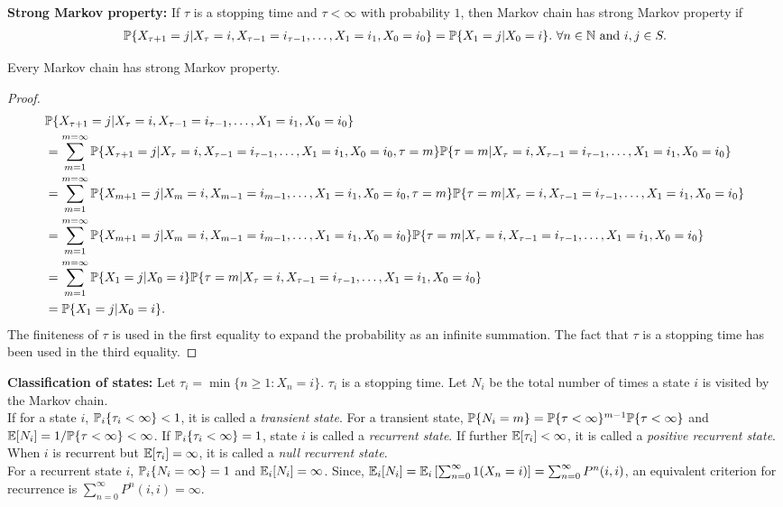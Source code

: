 \documentclass[all-lectures.tex]{subfiles}
\begin{document}
\indent \textbf{Strong Markov property:} If $\tau$ is a stopping time and $\tau < \infty$ with probability $1$, then Markov chain has strong Markov property if
\begin{align*}
\P\{X_{\tau+1} = j|X_{\tau} = i, X_{\tau-1} = i_{\tau-1},\dots,X_1 = i_1,X_0 = i_0\} = \P\{X_1 = j|X_{0} = i\}. \ \forall n \in \mathbb{N} \text{ and }i,j \in S.
\end{align*}
\begin{thm}
Every Markov chain has strong Markov property.
\begin{proof}
\begin{align*}
&\P\{X_{{\tau+1}} = j|X_{\tau} = i, X_{\tau-1} = i_{\tau-1},\dots,X_1 = i_1,X_0 = i_0\}  \\
&= \sum_{m = 1}^{m=\infty} \P\{X_{{\tau+1}} = j|X_{{\tau}} = i, X_{{\tau-1}} = i_{{\tau-1}},\dots,X_1 = i_1,X_0 = i_0,{\tau} = m\} \P\{{\tau} = m|X_{{\tau}} = i, X_{{\tau-1}} = i_{{\tau-1}},\dots,X_1 = i_1,X_0 = i_0\} \\
&= \sum_{m = 1}^{m=\infty} \P\{X_{m+1} = j|X_{m} = i, X_{m-1} = i_{m-1},\dots,X_1 = i_1,X_0 = i_0,{\tau} = m\} \P\{{\tau} = m|X_{{\tau}} = i, X_{{\tau-1}} = i_{{\tau-1}},\dots,X_1 = i_1,X_0 = i_0\} \\
&= \sum_{m = 1}^{m=\infty} \P\{X_{m+1} = j|X_{m} = i, X_{m-1} = i_{m-1},\dots,X_1 = i_1,X_0 = i_0\} \P\{{\tau} = m|X_{{\tau}} = i, X_{{\tau-1}} = i_{{\tau-1}},\dots,X_1 = i_1,X_0 = i_0\} \\
&= \sum_{m = 1}^{m=\infty} \P\{X_{1} = j|X_{0} = i\} \P\{{\tau} = m|X_{{\tau}} = i, X_{{\tau-1}} = i_{{\tau-1}},\dots,X_1 = i_1,X_0 = i_0\} \\
&= \P\{X_{1} = j|X_{0} = i\}.
\end{align*}
The finiteness of $\tau$ is used in the first equality to expand the probability as an infinite summation. The fact that ${\tau}$ is a stopping time has been used in the third equality. 
\end{proof}
\end{thm}
\textbf{Classification of states:} Let $\tau_i = \min\{n \geq 1 : X_n = i\}$. $\tau_i$ is a stopping time. Let $N_i$ be the total number of times a state $i$ is visited by the Markov chain.  \\
\indent If for a state $i$, $\P_i\{\tau_i < \infty\} < 1$, it is called a \textit{{transient state}}. For a transient state, $\P\{N_i = m \} = \\ \P\{\tau < \infty\}^{m-1}\P\{\tau < \infty\}$ and $\E[N_i] = 1/\P\{\tau < \infty\}< \infty$. 
\indent If $\P_i\{\tau_i < \infty\} = 1$, state $i$ is called a \textit{{recurrent state}}. If further $\E[\tau_i] < \infty$, it is called a \textit{positive recurrent state}. When $i$ is recurrent but $\E[\tau_i] = \infty$, it is called a \textit{null recurrent state}. \\
\indent For a recurrent state $i$, $\P_i\{N_i = \infty\} = 1$ and $\E_i[N_i] = \infty$. Since, $\E_i[N_i] = \E_i\left[\sum_{n=0}^\infty 1(X_n = i)\right] = \sum_{n=0}^\infty P^n(i,i)$, an equivalent criterion for recurrence is $\sum_{n=0}^\infty P^n(i,i) = \infty$. \\
 
\end{document}
